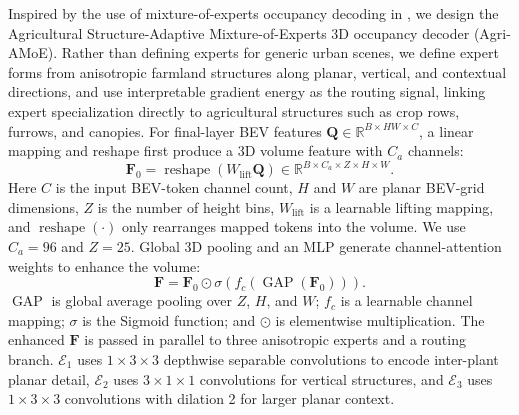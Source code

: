 \documentclass[a4paper,fleqn]{cas-sc}
\newcommand{\R}{\mathbb{R}}
\begin{document}
Inspired by the use of mixture-of-experts occupancy decoding in \citep{shi2026oneocc}, we design the Agricultural Structure-Adaptive Mixture-of-Experts 3D occupancy decoder (Agri-AMoE). Rather than defining experts for generic urban scenes, we define expert forms from anisotropic farmland structures along planar, vertical, and contextual directions, and use interpretable gradient energy as the routing signal, linking expert specialization directly to agricultural structures such as crop rows, furrows, and canopies. For final-layer BEV features $\bm{Q}\in\R^{B\times HW\times C}$, a linear mapping and reshape first produce a 3D volume feature with $C_a$ channels:
\begin{equation}
\bm{F}_0=\operatorname{reshape}(W_{\mathrm{lift}}\bm{Q})\in\R^{B\times C_a\times Z\times H\times W}.
\end{equation}
Here $C$ is the input BEV-token channel count, $H$ and $W$ are planar BEV-grid dimensions, $Z$ is the number of height bins, $W_{\mathrm{lift}}$ is a learnable lifting mapping, and $\operatorname{reshape}(\cdot)$ only rearranges mapped tokens into the volume. We use $C_a=96$ and $Z=25$. Global 3D pooling and an MLP generate channel-attention weights to enhance the volume:
\begin{equation}
\bm{F}=\bm{F}_0\odot\sigma\!\left(f_c(\operatorname{GAP}(\bm{F}_0))\right).
\end{equation}
$\operatorname{GAP}$ is global average pooling over $Z$, $H$, and $W$; $f_c$ is a learnable channel mapping; $\sigma$ is the Sigmoid function; and $\odot$ is elementwise multiplication. The enhanced $\bm{F}$ is passed in parallel to three anisotropic experts and a routing branch. $\mathcal{E}_1$ uses $1\times3\times3$ depthwise separable convolutions to encode inter-plant planar detail, $\mathcal{E}_2$ uses $3\times1\times1$ convolutions for vertical structures, and $\mathcal{E}_3$ uses $1\times3\times3$ convolutions with dilation 2 for larger planar context.
\end{document}
